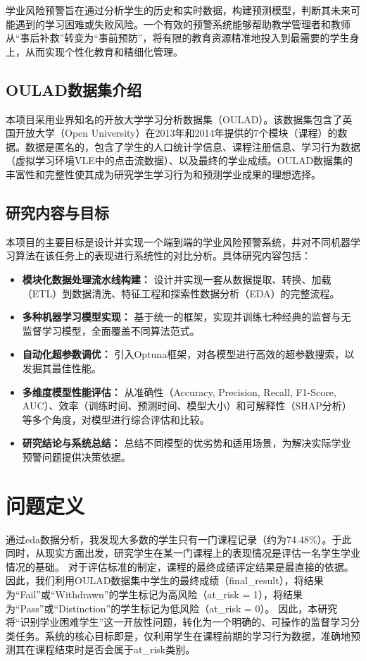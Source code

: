 \documentclass{SYSUReport}
\begin{document}
学业风险预警旨在通过分析学生的历史和实时数据，构建预测模型，判断其未来可能遇到的学习困难或失败风险。一个有效的预警系统能够帮助教学管理者和教师从“事后补救”转变为“事前预防”，将有限的教育资源精准地投入到最需要的学生身上，从而实现个性化教育和精细化管理。

\subsection{OULAD数据集介绍}
本项目采用业界知名的开放大学学习分析数据集（OULAD）\cite{kuzilek2017open}。该数据集包含了英国开放大学（Open University）在2013年和2014年提供的7个模块（课程）的数据。数据是匿名的，包含了学生的人口统计学信息、课程注册信息、学习行为数据（虚拟学习环境VLE中的点击流数据）、以及最终的学业成绩。OULAD数据集的丰富性和完整性使其成为研究学生学习行为和预测学业成果的理想选择。

\subsection{研究内容与目标}
本项目的主要目标是设计并实现一个端到端的学业风险预警系统，并对不同机器学习算法在该任务上的表现进行系统性的对比分析。具体研究内容包括：
\begin{itemize}
    \item \textbf{模块化数据处理流水线构建：} 设计并实现一套从数据提取、转换、加载（ETL）到数据清洗、特征工程和探索性数据分析（EDA）的完整流程。
    \item \textbf{多种机器学习模型实现：} 基于统一的框架，实现并训练七种经典的监督与无监督学习模型，全面覆盖不同算法范式。
    \item \textbf{自动化超参数调优：} 引入Optuna框架，对各模型进行高效的超参数搜索，以发掘其最佳性能。
    \item \textbf{多维度模型性能评估：} 从准确性（Accuracy, Precision, Recall, F1-Score, AUC）、效率（训练时间、预测时间、模型大小）和可解释性（SHAP分析）等多个角度，对模型进行综合评估和比较。
    \item \textbf{研究结论与系统总结：} 总结不同模型的优劣势和适用场景，为解决实际学业预警问题提供决策依据。
\end{itemize}

\section{问题定义}
通过eda数据分析，我发现大多数的学生只有一门课程记录（约为74.48\%）。于此同时，从现实方面出发，研究学生在某一门课程上的表现情况是评估一名学生学业情况的基础。
对于评估标准的制定，课程的最终成绩评定结果是最直接的依据。因此，我们利用OULAD数据集中学生的最终成绩（final\_result），将结果为“Fail”或“Withdrawn”的学生标记为高风险（at\_risk = 1），将结果为“Pass”或“Distinction”的学生标记为低风险（at\_risk = 0）。
因此，本研究将“识别学业困难学生”这一开放性问题，转化为一个明确的、可操作的监督学习分类任务。系统的核心目标即是，仅利用学生在课程前期的学习行为数据，准确地预测其在课程结束时是否会属于at\_risk类别。
\end{document}

